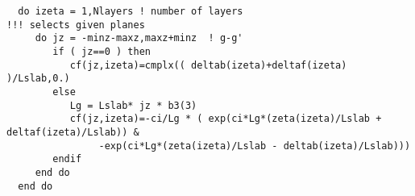\documentclass[letterpaper,10pt]{article}
\begin{document}
\begin{verbatim}
  do izeta = 1,Nlayers ! number of layers
!!! selects given planes
     do jz = -minz-maxz,maxz+minz  ! g-g'
        if ( jz==0 ) then
           cf(jz,izeta)=cmplx(( deltab(izeta)+deltaf(izeta) )/Lslab,0.)
        else
           Lg = Lslab* jz * b3(3) 
           cf(jz,izeta)=-ci/Lg * ( exp(ci*Lg*(zeta(izeta)/Lslab + deltaf(izeta)/Lslab)) &
                -exp(ci*Lg*(zeta(izeta)/Lslab - deltab(izeta)/Lslab)))
        endif
     end do
  end do
\end{verbatim}
\end{document}
